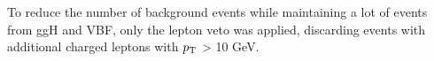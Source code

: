 To reduce the number of background events while maintaining a lot of events from ggH and VBF, only the lepton veto was applied, discarding events with additional charged leptons with $p_\text{T}$ > 10 GeV.%

